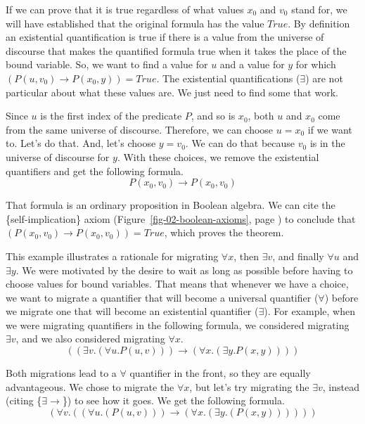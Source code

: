 {{If we can prove that it is true regardless of what values
$x_0$ and $v_0$ stand for, we will have established that the
original formula has the value $True$.
By definition an existential quantification is true if
there is a value from the universe of discourse that
makes the quantified formula true when it takes the place of
the bound variable.
So, we want to find a value for $u$ and a value for $y$
for which $(P(u, v_0) \rightarrow P(x_0, y)) = True$.
The existential quantifications ($\exists$) are not particular about
what these values are. We just need to find some that work.

Since $u$ is the first index of the predicate $P$,
and so is $x_0$, both $u$ and $x_0$ come from the same universe of discourse.
Therefore, we can choose $u = x_0$ if we want to. Let's do that.
And, let's choose $y = v_0$.
We can do that because $v_0$
is in the universe of discourse for $y$.
With these choices, we remove the existential quantifiers and
get the following formula.
$$P(x_0, v_0) \rightarrow P(x_0, v_0)$$

That formula is an ordinary proposition in Boolean algebra.
We can cite the \{self-implication\} axiom
(Figure~\ref{fig-02-boolean-axioms}, page \pageref{fig-02-boolean-axioms})
to conclude that $(P(x_0, v_0) \rightarrow P(x_0, v_0)) = True$,
which proves the theorem.

This example illustrates a rationale for migrating
$\forall x$, then $\exists v$, and finally $\forall u$ and $\exists y$.
We were motivated by the desire to wait as long as possible before having to
choose values for bound variables.
That means that whenever we have a choice, we want to migrate a quantifier
that will become a universal quantifier ($\forall$) before we migrate
one that will become an existential quantifier ($\exists$).
For example, when we were migrating quantifiers in the following formula,
we considered migrating $\exists v$,
and we also considered migrating $\forall x$.
$$((\exists v.(\forall u.P(u, v))) \rightarrow (\forall x.(\exists y.P(x, y))))$$

Both migrations lead to a $\forall$ quantifier in the front,
so they are equally advantageous.
We chose to migrate the $\forall x$, but let's try migrating
the $\exists v$, instead (citing \{${\exists}{\rightarrow}$\}) to see how it goes.
We get the following formula.
$$(\forall v.((\forall u.(P(u, v))) \rightarrow (\forall x.(\exists y.(P(x, y))))))$$

}}
